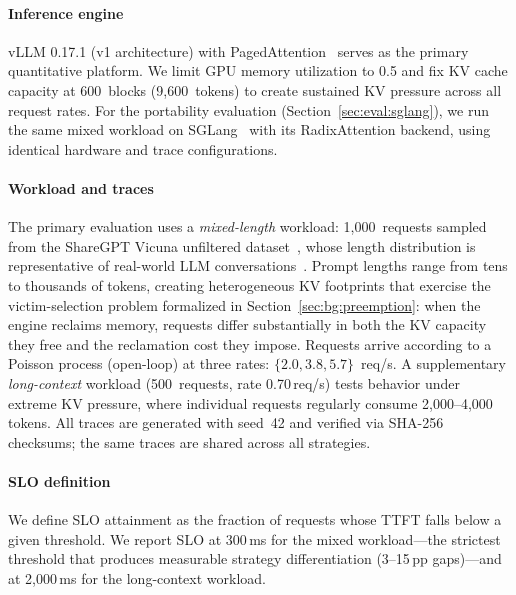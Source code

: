 \documentclass[conference]{IEEEtran}
\begin{document}
\paragraph{Inference engine}
vLLM 0.17.1 (v1 architecture) with PagedAttention~\cite{Kwon2023} serves as the
primary quantitative platform.  We limit GPU memory utilization to 0.5 and fix
KV cache capacity at 600~blocks (9{,}600~tokens) to create sustained KV
pressure across all request rates.
For the portability evaluation (Section~\ref{sec:eval:sglang}), we run the same
mixed workload on SGLang~\cite{Zheng2024sglang} with its RadixAttention backend,
using identical hardware and trace configurations.

\paragraph{Workload and traces}
The primary evaluation uses a \emph{mixed-length} workload: 1{,}000~requests
sampled from the ShareGPT Vicuna unfiltered
dataset~\cite{ShareGPT2023}, whose length distribution is
representative of real-world LLM conversations~\cite{Zheng2024lmsys}.
Prompt lengths range from tens to thousands of tokens, creating heterogeneous
KV footprints that exercise the victim-selection problem formalized in
Section~\ref{sec:bg:preemption}: when the engine reclaims memory, requests differ
substantially in both the KV capacity they free and the reclamation cost they
impose.  Requests arrive according to a Poisson process (open-loop) at three
rates: $\{2.0, 3.8, 5.7\}$~req/s.
A supplementary \emph{long-context} workload (500~requests,
rate 0.70\,req/s) tests behavior under extreme KV pressure, where
individual requests regularly consume 2{,}000--4{,}000 tokens.
All traces are generated with seed~42 and verified via SHA-256 checksums;
the same traces are shared across all strategies.

\paragraph{SLO definition}
We define SLO attainment as the fraction of requests whose TTFT falls below
a given threshold.  We report SLO at 300\,ms for the mixed workload---the
strictest threshold that produces measurable strategy differentiation
(3--15\,pp gaps)---and at 2{,}000\,ms for the long-context workload.
\end{document}

